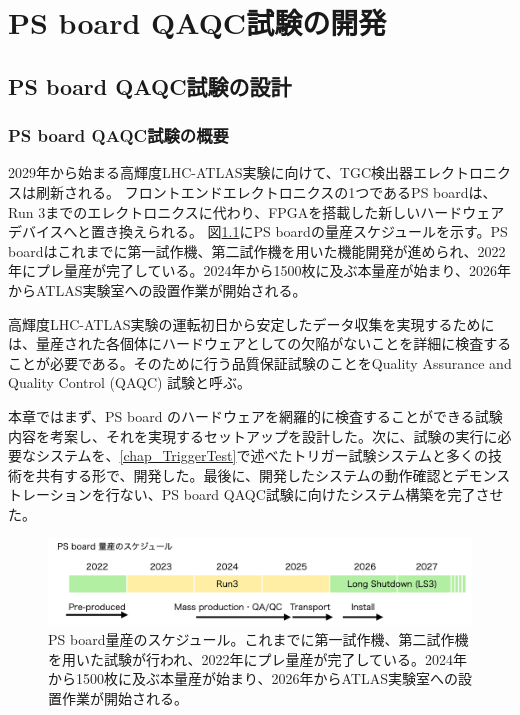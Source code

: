 \chapter{PS board QAQC試験の開発}
\label{chap_QAQC}

\section{PS board QAQC試験の設計}
\label{sec_QAQCdesign}
\subsection{PS board QAQC試験の概要}
\label{subsec_PSBschedule}
2029年から始まる高輝度LHC-ATLAS実験に向けて、TGC検出器エレクトロニクスは刷新される。
フロントエンドエレクトロニクスの1つであるPS boardは、Run 3までのエレクトロニクスに代わり、FPGAを搭載した新しいハードウェアデバイスへと置き換えられる。
図\ref{PSBschedule}にPS boardの量産スケジュールを示す。PS boardはこれまでに第一試作機、第二試作機を用いた機能開発が進められ、2022年にプレ量産が完了している。2024年から1500枚に及ぶ本量産が始まり、2026年からATLAS実験室への設置作業が開始される。


高輝度LHC-ATLAS実験の運転初日から安定したデータ収集を実現するためには、量産された各個体にハードウェアとしての欠陥がないことを詳細に検査することが必要である。そのために行う品質保証試験のことをQuality Assurance and Quality Control (QAQC) 試験と呼ぶ。

本章ではまず、PS board のハードウェアを網羅的に検査することができる試験内容を考案し、それを実現するセットアップを設計した。次に、試験の実行に必要なシステムを、\ref{chap_TriggerTest}で述べたトリガー試験システムと多くの技術を共有する形で、開発した。最後に、開発したシステムの動作確認とデモンストレーションを行ない、PS board QAQC試験に向けたシステム構築を完了させた。

\begin{figure} 
\centering
\includegraphics[width=16cm]{fig/QAQC/PSBschedule.png}
\caption[PS board量産のスケジュール]{PS board量産のスケジュール。これまでに第一試作機、第二試作機を用いた試験が行われ、2022年にプレ量産が完了している。2024年から1500枚に及ぶ本量産が始まり、2026年からATLAS実験室への設置作業が開始される。}
\label{PSBschedule}
\end{figure}

